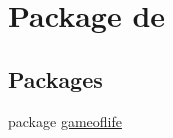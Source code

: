 \hypertarget{namespacede}{\section{Package de}
\label{namespacede}
}
\subsection*{Packages}
\begin{DoxyCompactItemize}
\item 
package \hyperlink{namespacede_1_1gameoflife}{gameoflife}
\end{DoxyCompactItemize}
